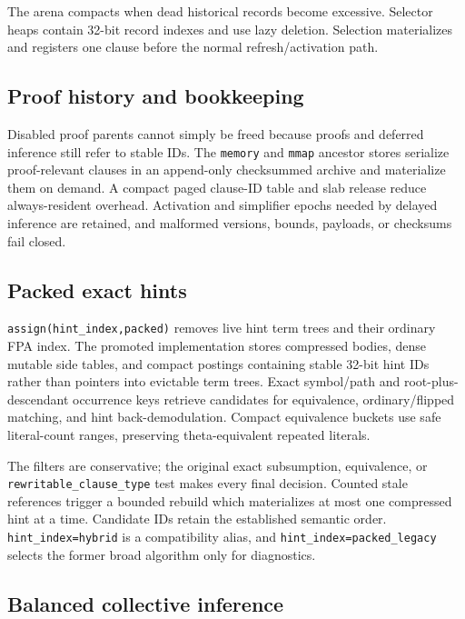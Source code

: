 \documentclass[11pt]{article}
\newcommand{\setting}[1]{\texttt{#1}}
\begin{document}
The arena compacts when dead historical records become excessive.  Selector
heaps contain 32-bit record indexes and use lazy deletion.  Selection
materializes and registers one clause before the normal refresh/activation
path.

\subsection{Proof history and bookkeeping}

Disabled proof parents cannot simply be freed because proofs and deferred
inference still refer to stable IDs.  The \setting{memory} and \setting{mmap}
ancestor stores serialize proof-relevant clauses in an append-only checksummed
archive and materialize them on demand.  A compact paged clause-ID table and
slab release reduce always-resident overhead.  Activation and simplifier epochs
needed by delayed inference are retained, and malformed versions, bounds,
payloads, or checksums fail closed.

\subsection{Packed exact hints}

\setting{assign(hint\_index,packed)} removes live hint term trees and their
ordinary FPA index.  The promoted implementation stores compressed bodies,
dense mutable side tables, and compact postings containing stable 32-bit hint
IDs rather than pointers into evictable term trees.  Exact symbol/path and
root-plus-descendant occurrence keys retrieve candidates for equivalence,
ordinary/flipped matching, and hint back-demodulation.  Compact equivalence
buckets use safe literal-count ranges, preserving theta-equivalent repeated
literals.

The filters are conservative; the original exact subsumption, equivalence, or
\setting{rewritable\_clause\_type} test makes every final decision.  Counted
stale references trigger a bounded rebuild which materializes at most one
compressed hint at a time.  Candidate IDs retain the established semantic
order.  \setting{hint\_index=hybrid} is a compatibility alias, and
\setting{hint\_index=packed\_legacy} selects the former broad algorithm only
for diagnostics.

\subsection{Balanced collective inference}
\end{document}
